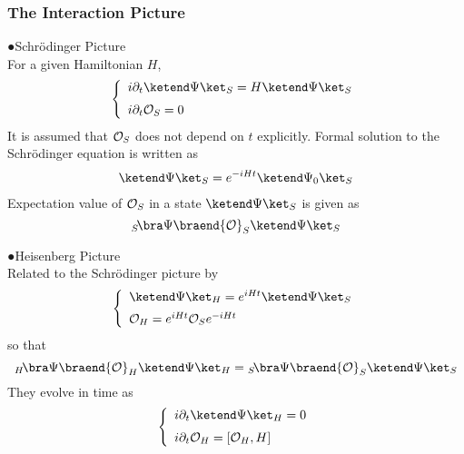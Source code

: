 \subsubsection{The Interaction Picture}
●Schr\"odinger Picture\\
For a given Hamiltonian $H$,
\begin{eqnarray}
\left\{
\begin{array}{l}
i \partial_t 
\ketend \Psi \ket_S
=
H \ketend \Psi \ket_S
\vspace{2mm}
\\
i \partial_t 
{\cal O}_S = 0
\end{array}
\right.
\end{eqnarray}
It is assumed that ${\cal O}_S$ does not depend on $t$ explicitly.
Formal solution to the Schr\"odinger equation is written as
\begin{eqnarray}
\ketend \Psi \ket_S = e^{-iHt} \ketend \Psi_0 \ket_S
\label{eqn:SchrPicFormalSol}
\end{eqnarray}
Expectation value of ${\cal O}_S$ in a state $\ketend \Psi \ket_S$ is given as
\begin{equation}
{}_S\!\bra \Psi \braend {\cal O}_S \ketend \Psi \ket_S
\end{equation}

\bigskip

\noindent
●Heisenberg Picture\\
Related to the Schr\"odinger picture by
\begin{eqnarray}
\left\{
\begin{array}{l}
\ketend \Psi \ket_H
=
e^{iHt}
\ketend \Psi \ket_S
\vspace{2mm}
\\
{\cal O}_H = 
e^{iHt} {\cal O}_S e^{-iHt}
\end{array}
\right.
\end{eqnarray}
so that
\begin{equation}
{}_H\!\bra \Psi \braend {\cal O}_H \ketend \Psi \ket_H
=
{}_S\!\bra \Psi \braend {\cal O}_S \ketend \Psi \ket_S
\end{equation}
They evolve in time as
\begin{eqnarray}
\left\{
\begin{array}{l}
i \partial_t 
\ketend \Psi \ket_H
=
0
\vspace{2mm}
\\
i \partial_t 
{\cal O}_H = 
[ {\cal O}_H, H]
\end{array}
\right.
\end{eqnarray}

